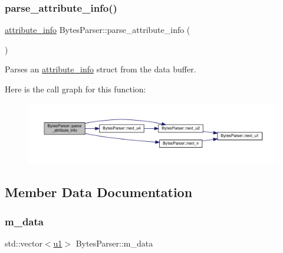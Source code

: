 \subsubsection{\texorpdfstring{parse\+\_\+attribute\+\_\+info()}{parse\_attribute\_info()}}
{\footnotesize\ttfamily \hyperlink{structattribute__info}{attribute\+\_\+info} Bytes\+Parser\+::parse\+\_\+attribute\+\_\+info (\begin{DoxyParamCaption}{ }\end{DoxyParamCaption})}



Parses an \hyperlink{structattribute__info}{attribute\+\_\+info} struct from the data buffer. 

Here is the call graph for this function\+:\nopagebreak
\begin{figure}[H]
\begin{center}
\leavevmode
\includegraphics[width=350pt]{classBytesParser_ab7c84f75bd3dc2bcac74fd3ff4c6510a_cgraph}
\end{center}
\end{figure}


\subsection{Member Data Documentation}
\mbox{\label{classBytesParser_a89b64c815664cea2869895e24d3e1ed3}} 
\subsubsection{\texorpdfstring{m\+\_\+data}{m\_data}}
{\footnotesize\ttfamily std\+::vector$<$\hyperlink{types_8h_a162f47a77ee24f6f77cd8c82ccd40ab7}{u1}$>$ Bytes\+Parser\+::m\+\_\+data\hspace{0.3cm}{\ttfamily [private]}}

\mbox{\label{classBytesParser_a1116068a071fde3c2b634772c806af99}} 
